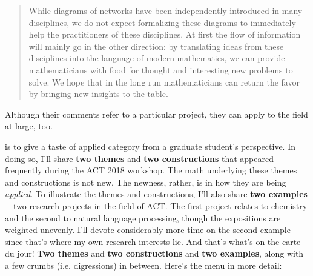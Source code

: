 \documentclass{tufte-handout-tai}
\theoremstyle{plain}
\theoremstyle{definition}
\theoremstyle{remark}
\begin{document}
	\begin{quote}While diagrams of networks have been independently introduced in many disciplines, we do not expect formalizing these diagrams to immediately help the practitioners of these disciplines. At first the flow of information will mainly go in the other direction: by translating ideas from these disciplines into the language of modern mathematics, we can provide mathematicians with food for thought and interesting new problems to solve. We hope that in the long run mathematicians can return the favor by bringing new insights to the table.
	\end{quote} 

\begin{fullwidth}
Although their comments refer to a particular project, they can apply to the field at large, too.



 is to give a taste of applied category from a graduate student's perspective. In doing so, I'll share \textbf{two themes} and \textbf{two constructions} that appeared frequently during the ACT 2018 workshop. The math underlying these themes and constructions is not new. The newness, rather, is in how they are being \textit{applied}. To illustrate the themes and constructions, I'll also share \textbf{two examples}---two research projects in the field of ACT. The first project relates to chemistry and the second to natural language processing, though the expositions are weighted unevenly. I'll devote considerably more time on the second example since that's where my own research interests lie. And that's what's on the carte du jour! \textbf{Two themes} and \textbf{two constructions} and \textbf{two examples}, along with a few crumbs (i.e. digressions) in between. Here's the menu in more detail:
\end{fullwidth}
\end{document}
